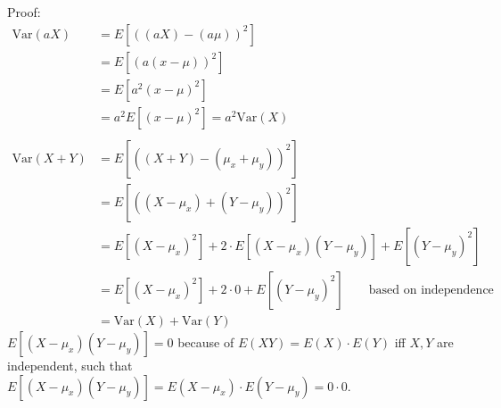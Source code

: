 \documentclass[12pt]{article}
\begin{document}
\begin{enumerate}
Proof: 
\begin{align*} 
\text{Var}(a X) & = E[ \left( (aX) - (a \mu) \right) ^2]  \\
& = E[ (a(x - \mu))^2] \\
& = E[a^2 (x- \mu)^2] \\
& = a^2 E[(x - \mu)^2] = a^2 \text{Var}(X) \\\\
\text{Var} (X + Y)  & = E[ \left( (X+Y) - (\mu_x + \mu_y) \right) ^2] \\ 
& = E[\left( (X - \mu_x) + (Y - \mu_y) \right) ^2] \\ 
& = E[ (X - \mu_x)^2] + 2 \cdot E[(X - \mu_x)(Y - \mu_y)] + E[(Y - \mu_y)^2] \\ 
& = E[ (X - \mu_x)^2] + 2 \cdot 0 + E[(Y - \mu_y)^2] \qquad \text{based on independence} \\
& = \text{Var}(X) + \text{Var}(Y)
\end{align*}
$ E[(X - \mu_x)(Y - \mu_y)] = 0 $ because of $E(XY) = E(X) \cdot E(Y)$ iff $X, Y$ are independent, such that $ E[(X - \mu_x)(Y - \mu_y)] = E(X - \mu_x) \cdot E(Y - \mu_y) = 0 \cdot 0 $.
 











\end{enumerate}
\end{document}
